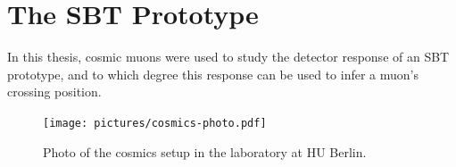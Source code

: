     
    
    
    
    
    

    

    

    
    
    




\section{The SBT Prototype}

In this thesis, cosmic muons were used to study the detector response of an \ac{SBT} prototype, and to which degree this response can be used to infer a muon's crossing position.

\begin{figure}[h]
	\centering
	\texttt{[image: pictures/cosmics-photo.pdf]}
	\caption{Photo of the cosmics setup in the laboratory at \ac{HU} Berlin.}
	\label{fig:cosmics-photo}
\end{figure}

